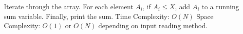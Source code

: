 Iterate through the array. For each element $A_i$, if $A_i \le X$, add $A_i$ to a running sum variable. Finally, print the sum.
Time Complexity: $O(N)$
Space Complexity: $O(1)$ or $O(N)$ depending on input reading method.